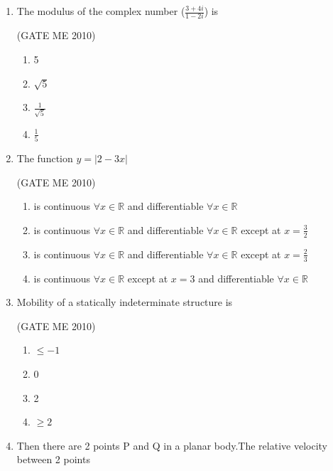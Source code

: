 \documentclass[journal,12pt,onecolumn]{IEEEtran}
\theoremstyle{remark}
\begin{document}
\begin{enumerate}
\item  The modulus of the complex number ($\frac{3+4i}{1-2i}$) is

 \hfill{(GATE ME 2010)}\\
 
\begin{multicols}{4}
    \begin{enumerate}

        \item 5
        \item $\sqrt{5}$
        \item $\frac{1}{\sqrt{5}}$
        \item $\frac{1}{5}$
 \end{enumerate}
\end{multicols}


\item The function $y = |2 - 3x|$

 \hfill{(GATE ME 2010)}\\
 
\begin{enumerate}
\item is continuous $\forall x \in  \mathbb{R}$ and differentiable $\forall x \in \mathbb{R}$
\item is continuous $\forall x \in \mathbb{R}$ and differentiable $\forall x \in \mathbb{R}$ except at $x = \frac{3}{2}$
\item is continuous $\forall x \in \mathbb{R}$ and differentiable $\forall x \in \mathbb{R}$ except at $x = \frac{2}{3}$
\item is continuous $\forall x \in \mathbb{R}$ except at $x = 3$ and differentiable $\forall x \in \mathbb{R}$
\end{enumerate}

 
\item  Mobility of a statically indeterminate structure is 

 \hfill{(GATE ME 2010)}\\
\begin{multicols}{4}
\begin{enumerate}
\item $\le{-1}$
\item 0
\item 2 
\item $\ge{2}$
\end{enumerate}
\end{multicols}


\item  Then there are 2 points P and Q in a planar body.The relative velocity between 2 points



\end{enumerate}
\end{document}
